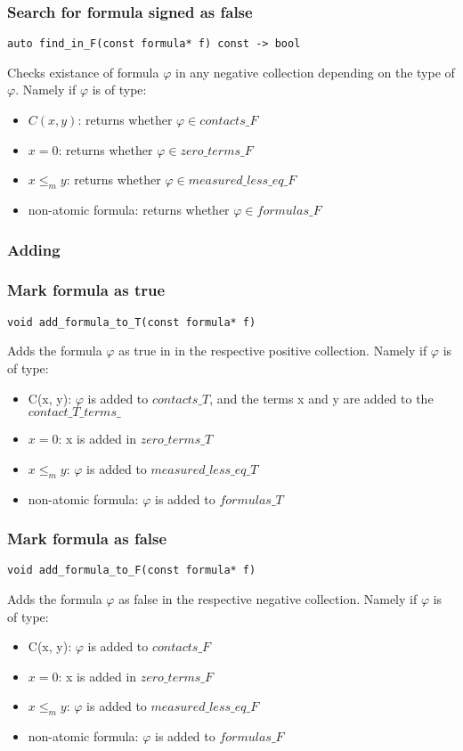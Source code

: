 \documentclass{article}
\begin{document}
	\subsubsection*{Search for formula signed as false}
\begin{lstlisting}
auto find_in_F(const formula* f) const -> bool
\end{lstlisting}
	Checks existance of formula $\varphi$ in any negative collection depending on the type of $\varphi$. Namely if $\varphi$ is of type:
	\begin{itemize}
		\item $C(x, y)$: returns whether $\varphi \in contacts\_F$
		\item $x = 0$: returns whether $\varphi \in zero\_terms\_F$
		\item $x \le_m y$: returns whether $\varphi \in measured\_less\_eq\_F$
		\item non-atomic formula: returns whether $\varphi \in formulas\_F$
	\end{itemize}

	\subsubsection*{Adding}
	\subsubsection*{Mark formula as true}
\begin{lstlisting}
void add_formula_to_T(const formula* f)
\end{lstlisting}
	Adds the formula $\varphi$ as true in in the respective positive collection. Namely if $\varphi$ is of type:
	\begin{itemize}
		\item C(x, y): $\varphi$ is added to $contacts\_T$, and the terms x and y are added to the $contact\_T\_terms\_$
		\item $x = 0$: x is added in $zero\_terms\_T$
		\item $x \le_m y$: $\varphi$ is added to $measured\_less\_eq\_T$
		\item non-atomic formula: $\varphi$ is added to $formulas\_T$
	\end{itemize}

	\subsubsection*{Mark formula as false}
\begin{lstlisting}
void add_formula_to_F(const formula* f)
\end{lstlisting}
	Adds the formula $\varphi$ as false in the respective negative collection. Namely if $\varphi$ is of type:
	\begin{itemize}
		\item C(x, y): $\varphi$ is added to $contacts\_F$
		\item $x = 0$: x is added in $zero\_terms\_F$
		\item $x \le_m y$: $\varphi$ is added to $measured\_less\_eq\_F$
		\item non-atomic formula: $\varphi$ is added to $formulas\_F$
	\end{itemize}
\end{document}
